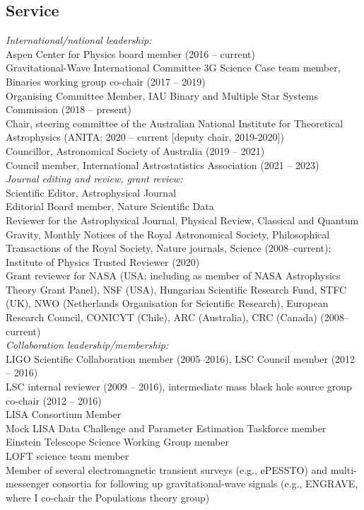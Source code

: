 \documentclass[margin,line]{res}
\begin{document}
\begin{resume}
\section{\sc Service}

{\it International/national leadership:}\\
Aspen Center for Physics board member (2016 -- current)\\
Gravitational-Wave International Committee 3G Science Case team member, Binaries working group co-chair (2017 -- 2019)\\
Organising Committee Member, IAU Binary and Multiple Star Systems Commission (2018 -- present)\\
Chair, steering committee of the Australian National Institute for Theoretical Astrophysics (ANITA; 2020 -- current [deputy chair, 2019-2020])\\
Councillor, Astronomical Society of Australia (2019 -- 2021)\\
Council member, International Astrostatistics Association (2021 -- 2023)\\

{\it Journal editing and review, grant review:}\\
Scientific Editor, Astrophysical Journal\\
Editorial Board member, Nature Scientific Data\\
Reviewer for the Astrophysical Journal, Physical Review, Classical and Quantum Gravity, Monthly Notices of the Royal Astronomical Society, Philosophical Transactions of the Royal Society, Nature journals, Science (2008--current); Institute of Physics Trusted Reviewer (2020) \\
Grant reviewer for NASA (USA; including as member of NASA Astrophysics Theory Grant Panel), NSF (USA), Hungarian Scientific Research Fund, STFC (UK), NWO (Netherlands Organisation for Scientific Research), European Research Council, CONICYT (Chile), ARC (Australia), CRC (Canada) (2008--current)\\

{\it Collaboration leadership/membership:}\\
LIGO Scientific Collaboration member (2005--2016), LSC Council member (2012 -- 2016)\\
LSC internal reviewer (2009 -- 2016), intermediate mass black hole source group co-chair (2012 -- 2016)\\
LISA Consortium Member\\
Mock LISA Data Challenge and Parameter Estimation Taskforce member\\
Einstein Telescope Science Working Group member\\
LOFT science team member\\
Member of several electromagnetic transient surveys (e.g., ePESSTO) and multi-messenger  consortia for following up gravitational-wave signals (e.g., ENGRAVE, where I co-chair the Populations theory group)\\


\end{resume}
\end{document}
